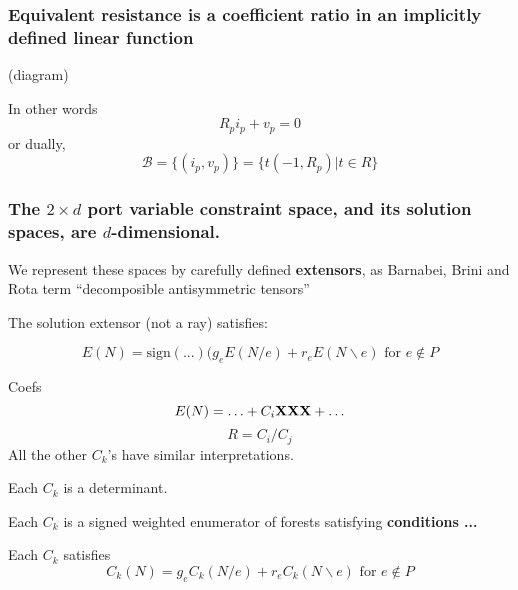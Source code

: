 \documentclass{beamer}
\begin{document}
\begin{frame}
\frametitle{Equivalent resistance is a coefficient ratio in an 
implicitly defined linear function}

(diagram)

In other words
\[
R_pi_p + v_p = 0
\]
or dually,
\[
\mathcal{B} = \{(i_p,v_p)\}
= \{ t(-1, R_p) | t\in R\}
\]

\end{frame}


\begin{frame}
\frametitle{The $2\times d$ port variable constraint space, 
and its solution spaces, are $d$-dimensional.}

We represent these spaces by carefully defined
\textbf{extensors}, as Barnabei, Brini and Rota \cite{exteriorCalc}
term ``decomposible antisymmetric tensors''

The solution extensor (not a ray) satisfies:

\[
E(N) = \text{sign}(...)(g_e E(N/e) + r_e E(N\backslash e)
\text{\ for\ }e\not\in P
\]

\end{frame}



\begin{frame}{Coefs}
\[
E(N) = \ldots + C_i\mbox{\bf XXX} + \ldots
\]
\[
R = C_i/C_j
\]
All the other $C_k$'s have similar interpretations.

Each $C_k$ is a determinant.

Each $C_k$ is a signed weighted enumerator of
forests satisfying \textbf{conditions ...}

Each $C_k$ satisfies
\[
C_k(N) = g_e C_k(N/e) + r_e C_k(N\backslash e)
\text{\ for\ }e\not\in {P}
\]

\end{frame}
\end{document}
